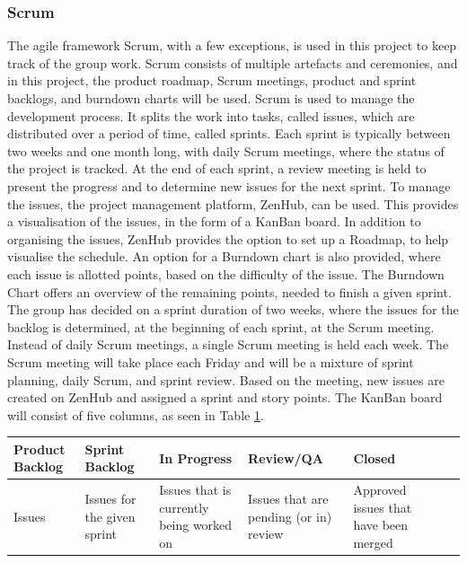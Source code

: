 \subsubsection{Scrum}
The agile framework Scrum, with a few exceptions, is used in this project to
keep track of the group work. Scrum consists of multiple artefacts and
ceremonies, and in this project, the product roadmap, Scrum meetings, product
and sprint backlogs, and burndown charts will be used.
Scrum is used to manage the development process. It splits
the work into tasks, called issues, which are distributed over a period of time,
called sprints. Each sprint is typically between two weeks and one month long,
with daily Scrum meetings, where the status of the project is tracked. At the
end of each sprint, a review meeting is held to present the progress and to
determine new issues for the next sprint.
To manage the issues, the project management platform, ZenHub, can be used. This
provides a visualisation of the issues, in the form of a KanBan board. In
addition to organising the issues, ZenHub provides the option to set up a
Roadmap, to help visualise the schedule. An option for a Burndown chart is also
provided, where each issue is allotted points, based on the difficulty of the
issue. The Burndown Chart offers an overview of the remaining points, needed to
finish a given sprint. \cite{scrum} \\

The group has decided on a sprint duration of two weeks, where the issues
for the backlog is determined, at the beginning of each sprint, at the Scrum
meeting. Instead of daily Scrum meetings, a single Scrum meeting is held each
week. The Scrum meeting will take place each Friday and will be a mixture of
sprint planning, daily Scrum, and sprint review. Based on the meeting, new
issues are created on ZenHub and assigned a sprint and story points. The KanBan
board will consist of five columns, as seen in Table \ref{table:scrum}.

\begin{table}[H]
    \begin{tabularx}{\textwidth}{|>{\RaggedRight}X|>{\RaggedRight}X|>{\RaggedRight}X|>{\RaggedRight}X|>{\RaggedRight}X|>{\RaggedRight}X|>{\RaggedRight}X|}
        \hline                             
        \textbf{Product Backlog} & \textbf{Sprint Backlog} & \textbf{In Progress} & \textbf{Review/QA} & \textbf{Closed} \\
        \hline
        Issues & Issues for the given sprint & Issues that is currently being worked on & Issues that are pending (or in) review & Approved issues that have been merged    \\
        \hline
    \end{tabularx}
    \label{table:scrum}
\end{table} 

